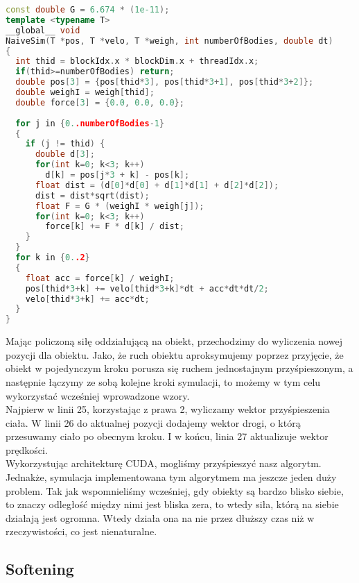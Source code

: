 \documentclass[14pt,twoside,a4paper]{article}
\theoremstyle{definition}
\begin{document}
\bigskip
{}\begin{lstlisting}[language=C++, frame=single, framerule=2pt, caption=Kernel NaiveSim]
const double G = 6.674 * (1e-11);
template <typename T>
__global__ void 
NaiveSim(T *pos, T *velo, T *weigh, int numberOfBodies, double dt) 
{
  int thid = blockIdx.x * blockDim.x + threadIdx.x;
  if(thid>=numberOfBodies) return;
  double pos[3] = {pos[thid*3], pos[thid*3+1], pos[thid*3+2]};
  double weighI = weigh[thid];
  double force[3] = {0.0, 0.0, 0.0};
  
  for j in {0..numberOfBodies-1}
  {
    if (j != thid) {
      double d[3];
      for(int k=0; k<3; k++) 
        d[k] = pos[j*3 + k] - pos[k];
      float dist = (d[0]*d[0] + d[1]*d[1] + d[2]*d[2]);
      dist = dist*sqrt(dist);
      float F = G * (weighI * weigh[j]);
      for(int k=0; k<3; k++)
        force[k] += F * d[k] / dist;	
    }
  }
  for k in {0..2}
  {
    float acc = force[k] / weighI;
    pos[thid*3+k] += velo[thid*3+k]*dt + acc*dt*dt/2;
    velo[thid*3+k] += acc*dt;
  }
}
\end{lstlisting}


Mając policzoną siłę oddziałującą na obiekt, przechodzimy do wyliczenia nowej pozycji dla obiektu. Jako, że ruch obiektu aproksymujemy poprzez przyjęcie, że obiekt w pojedynczym kroku porusza się ruchem jednostajnym przyśpieszonym, a następnie łączymy ze sobą kolejne kroki symulacji, to możemy w tym celu wykorzystać wcześniej wprowadzone wzory.\\ Najpierw w linii 25, korzystając z prawa 2, wyliczamy wektor przyśpieszenia ciała. W linii 26 do aktualnej pozycji dodajemy wektor drogi, o którą przesuwamy ciało po obecnym kroku. I w końcu, linia 27 aktualizuje wektor prędkości.\\
Wykorzystując architekturę CUDA, mogliśmy przyśpieszyć nasz algorytm. Jednakże, symulacja implementowana tym algorytmem ma jeszcze jeden duży problem. Tak jak wspomnieliśmy wcześniej, gdy obiekty są bardzo blisko siebie, to znaczy odległość między nimi jest bliska zera, to wtedy siła, którą na siebie działają jest ogromna. Wtedy działa ona na nie przez dłuższy czas niż w rzeczywistości, co jest nienaturalne.
\subsection{\Large Softening} 
\end{document}

